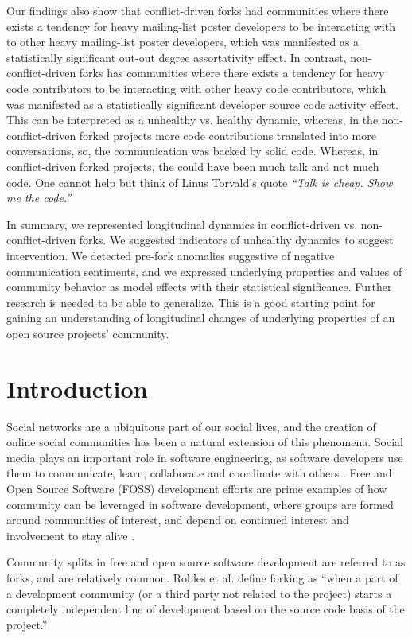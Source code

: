 \documentclass[12pt]{report}
\begin{document}
Our findings also show that conflict-driven forks had communities where there exists a tendency for heavy mailing-list poster developers to be interacting with to other heavy mailing-list poster developers, which was manifested as a statistically significant out-out degree assortativity effect. In contrast, non-conflict-driven forks has communities where there exists a tendency for heavy code contributors to be interacting with other heavy code contributors, which was manifested as a statistically significant developer source code activity effect. This can be interpreted as a unhealthy vs. healthy dynamic, whereas, in the non-conflict-driven forked projects more code contributions translated into more conversations, so, the communication was backed by solid code. Whereas, in conflict-driven forked projects, the could have been much talk and not much code. One cannot help but think of Linus Torvald's quote \textit{``Talk is cheap. Show me the code.''}

In summary, we represented longitudinal dynamics in conflict-driven vs. non-conflict-driven forks. We suggested indicators of unhealthy dynamics to suggest intervention. We detected pre-fork anomalies suggestive of negative communication sentiments, and we expressed underlying properties and values of community behavior as model effects with their statistical significance. Further research is needed to be able to generalize. This is a good starting point for gaining an understanding of longitudinal changes of underlying properties of an open source projects' community.

\pagebreak

\section{Introduction}
\label{introduction}
Social networks are a ubiquitous part of our social lives, and the creation of online social communities has been a natural extension of this phenomena. Social media plays an important role in software engineering, as software developers use them to communicate, learn, collaborate and coordinate with others \cite{Storey}. Free and Open Source Software (FOSS) development efforts are prime examples of how community can be leveraged in software development, where groups are formed around communities of interest, and depend on continued interest and involvement to stay alive \cite{NymanCodeForking}.

Community splits in free and open source software development are referred to as forks, and are relatively common. Robles et al. \cite{Robles} define forking as ``when a part of a development community (or a third party not related to the project) starts a completely independent line of development based on the source code basis of the project.'' 
\end{document}
